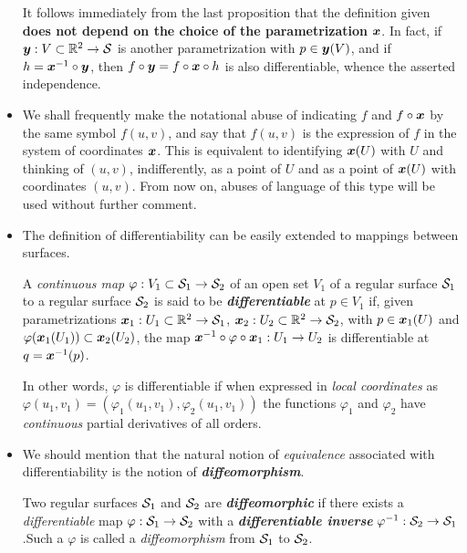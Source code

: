 \documentclass[11pt]{article}
\begin{document}
\begin{itemize}
It follows immediately from the last proposition that the definition given \textbf{does not depend on the choice of the parametrization} $\boldsymbol{x}$. In fact, if $\boldsymbol{y}: V \subset {\mathbb R}^2 \rightarrow {\mathcal S}$ is another parametrization with $p \in \boldsymbol{y}(V)$, and if $h = \boldsymbol{x}^{-1} \circ \boldsymbol{y}$, then $f \circ \boldsymbol{y} = f \circ \boldsymbol{x} \circ h$ is also differentiable, whence the asserted independence.

\item We shall frequently make the notational abuse of indicating $f$ and $f \circ \boldsymbol{x}$ by the same symbol $f(u, v)$, and say that $f(u, v)$ is the expression of $f$ in the system of coordinates $\boldsymbol{x}$. This is equivalent to identifying $\boldsymbol{x}(U)$ with $U$ and thinking of $(u, v)$, indifferently, as a point of $U$ and as a point of $\boldsymbol{x}(U)$ with coordinates $(u,v)$. From now on, abuses of language of this type will be used without further comment.

\item The definition of differentiability can be easily extended to mappings between surfaces. 
\begin{definition}
A \emph{continuous map} $\varphi: V_1 \subset {\mathcal S}_1 \rightarrow {\mathcal S}_2$ of an open set $V_1$ of a regular surface ${\mathcal S}_1$ to a regular surface ${\mathcal S}_2$ is said to be \emph{\textbf{differentiable}} at $p \in V_1$ if, given parametrizations $\boldsymbol{x}_1: U_1 \subset {\mathbb R}^2 \rightarrow {\mathcal S}_1$,  $\boldsymbol{x}_2: U_2 \subset {\mathbb R}^2 \rightarrow {\mathcal S}_2$, with $p \in \boldsymbol{x}_1(U)$ and $\varphi(\boldsymbol{x}_1(U_1)) \subset \boldsymbol{x}_2(U_2)$, the map
$\boldsymbol{x}^{-1} \circ \varphi \circ \boldsymbol{x}_1: U_1 \rightarrow U_2$ is differentiable at $q = \boldsymbol{x}^{-1}(p)$. 
\end{definition}
In other words, $\varphi$ is differentiable if when expressed in \emph{local coordinates} as $\varphi(u_1,v_1) = (\varphi_1(u_1,v_1), \varphi_2(u_1,v_1))$ the functions $\varphi_1$ and $\varphi_2$ have \emph{continuous} partial derivatives of all orders.

\item We should mention that the natural notion of \emph{equivalence} associated with differentiability is the notion of \emph{\textbf{diffeomorphism}}.

Two regular surfaces ${\mathcal S}_1$ and ${\mathcal S}_2$ are \emph{\textbf{diffeomorphic}} if there exists a \emph{differentiable} map $\varphi: {\mathcal S}_1 \rightarrow {\mathcal S}_2$ with a \emph{\textbf{differentiable inverse}} $\varphi^{-1}: {\mathcal S}_2 \rightarrow {\mathcal S}_1$.Such a $\varphi$ is called a \emph{diffeomorphism} from ${\mathcal S}_1$ to ${\mathcal S}_2$. 


\end{itemize}
\end{document}
